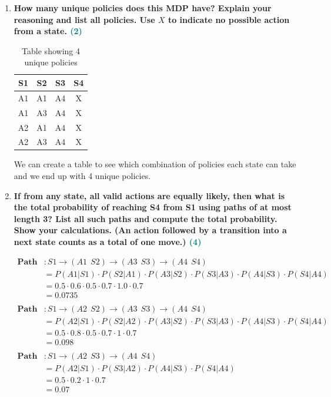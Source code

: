 \documentclass[a4paper]{article}
\begin{document}
\begin{sloppypar}
\begin{enumerate}[start=8,label=Q\arabic*,left=0pt]
    \item \textbf{How many unique policies does this MDP have? Explain your reasoning and list all policies. Use $X$ to indicate no possible action from a state. \hfill \textcolor{teal}{(2)}}
    
    \begin{table}[h!]
    \centering
    \begin{tabular}{ |c|c|c|c| } 
        \hline
        S1 & S2 & S3 & S4 \\
        \hline
        A1 & A1 & A4 & X \\ 
        A1 & A3 & A4 & X \\ 
        A2 & A1 & A4 & X \\ 
        A2 & A3 & A4 & X \\ 
        \hline
    \end{tabular}
    \caption{Table showing 4 unique policies}
    \label{table:1}
    \end{table}

    We can create a table to see which combination of policies each state can take and we end up
    with 4 unique policies.
    
    \item \textbf{If from any state, all valid actions are equally likely, then what is the total probability
    of reaching S4 from S1 using paths of at most length 3? List all such paths and compute
    the total probability. Show your calculations. (An action followed by a transition into a next
    state counts as a total of one move.) \hfill \textcolor{teal}{(4)}}
    
    \begin{align*}
        \textbf{Path 1}&: S1 \rightarrow (A1 \:\: S2) \rightarrow (A3 \:\: S3) \rightarrow (A4 \:\: S4) \\
        &= P(A1 | S1) \cdot P(S2 | A1) \cdot P(A3 | S2) \cdot P(S3 | A3) \cdot P(A4 | S3) \cdot P(S4 | A4) \\
        &= 0.5 \cdot 0.6 \cdot 0.5 \cdot 0.7 \cdot 1.0 \cdot 0.7 \\
        &= 0.0735 \\\\
        \textbf{Path 2}&: S1 \rightarrow (A2 \:\: S2) \rightarrow (A3 \:\: S3) \rightarrow (A4 \:\: S4) \\
        &= P(A2 | S1) \cdot P(S2 | A2) \cdot P(A3 | S2) \cdot P(S3 | A3) \cdot P(A4 | S3) \cdot P(S4 | A4) \\
        &= 0.5 \cdot 0.8 \cdot 0.5 \cdot 0.7 \cdot 1 \cdot 0.7 \\
        &=  0.098 \\\\
        \textbf{Path 3}&: S1 \rightarrow (A2 \:\: S3) \rightarrow (A4 \:\: S4) \\
        &= P(A2 | S1) \cdot P(S3 | A2) \cdot P(A4 | S3) \cdot P(S4 | A4) \\
        &= 0.5 \cdot 0.2 \cdot 1 \cdot 0.7 \\
        &= 0.07
    \end{align*}


\end{enumerate}
\end{sloppypar}
\end{document}

